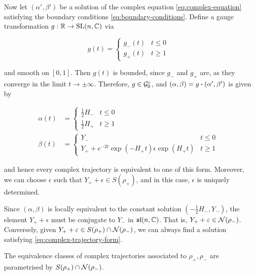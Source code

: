 \documentclass{article}
\renewcommand{\sl}{\mathfrak{sl}}
\begin{document}
Now let \((\alpha', \beta')\) be a solution of the complex equation \cref{eq:complex-equation} satisfying the boundary conditions \cref{eq:boundary-conditions}. Define a gauge transformation \(g : \mathbb{R} \to \operatorname{SL}(n, \mathbb{C})\) via

\begin{equation}
    g(t) = \begin{cases}
        g_-(t) & t \le 0 \\
        g_+(t) & t \ge 1
    \end{cases}
\end{equation}

and smooth on \([0, 1]\). Then \(g(t)\) is bounded, since \(g_-\) and \(g_+\) are, as they converge in the limit \(t \to \pm\infty\). Therefore, \(g \in \mathcal{G}_0^c\), and \((\alpha, \beta) = g \vdot (\alpha', \beta')\) is given by

\begin{equation}
    \label{eq:complex-trajectory-form}
    \begin{split}
        \alpha(t) &= \begin{cases}
            \frac{1}{2}H_- & t \le 0 \\
            \frac{1}{2}H_+ & t \ge 1
        \end{cases} \\
        \beta(t) &= \begin{cases}
            Y_- & t \le 0 \\
            Y_+ + e^{-2t}\exp(-H_+t)\epsilon\exp(H_+t) & t \ge 1
        \end{cases}
    \end{split}
\end{equation}

and hence every complex trajectory is equivalent to one of this form. Moreover, we can choose \(\epsilon\) such that \(Y_+ + \epsilon \in S(\rho_+)\), and in this case, \(\epsilon\) is uniquely determined.

Since \((\alpha, \beta)\) is locally equivalent to the constant solution \((-\frac{1}{2}H_-, Y_-)\), the element \(Y_+ + \epsilon\) must be conjugate to \(Y_-\) in \(\sl(n, \C)\). That is, \(Y_+ + \varepsilon \in \mathcal{N}(\rho_-)\). Conversely, given \(Y_+ + \varepsilon \in S(\rho_+) \cap \mathcal{N}(\rho_-)\), we can always find a solution satisfying \cref{eq:complex-trajectory-form}.

\begin{proposition}
    \label{prop:complex-trajectory-classification}

    The equivalence classes of complex trajectories associated to \(\rho_+, \rho_-\) are parametrised by \(S(\rho_+) \cap \mathcal{N}(\rho_-)\).
\end{proposition}
\end{document}
